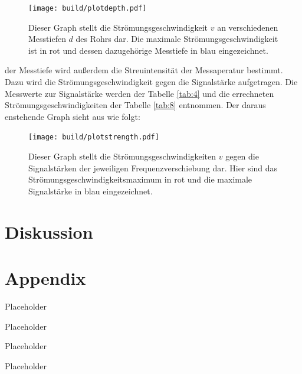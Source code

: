 \begin{figure}[H]
    \centering
    \texttt{[image: build/plotdepth.pdf]}
    \caption{Dieser Graph stellt die Strömungsgeschwindigkeit $v$ an verschiedenen Messtiefen $d$ des Rohrs dar. Die maximale Strömungsgeschwindigkeit ist in rot und dessen dazugehörige
    Messtiefe in blau eingezeichnet.}
    \label{fig:8}
\end{figure}

    \justifying der Messtiefe wird außerdem die Streuintensität der Messaperatur bestimmt. Dazu wird die Strömungsgeschwindigkeit gegen die Signalstärke aufgetragen.
    Die Messwerte zur Signalstärke werden der Tabelle \ref{tab:4} und die errechneten Strömungsgeschwindigkeiten der Tabelle \ref{tab:8} entnommen. Der daraus enstehende Graph
    sieht aus wie folgt:

\begin{figure}[H]
    \centering
    \texttt{[image: build/plotstrength.pdf]}
    \caption{Dieser Graph stellt die Strömungsgeschwindigkeiten $v$ gegen die Signalstärken der jeweiligen Frequenzverschiebung dar. Hier sind das Strömungsgeschwindigkeitsmaximum
    in rot und die maximale Signalstärke in blau eingezeichnet.}
    \label{fig:9}
\end{figure}

\section{Diskussion}

\newpage
\printbibliography

\newpage
\section*{Appendix}

\begin{table}[H]
    \centering
    \caption{Placeholder}
    
    \label{tab:1}
\end{table}

\begin{table}[H]
    \centering
    \caption{Placeholder}
    
    \label{tab:2}
\end{table}

\begin{table}[H]
    \centering
    \caption{Placeholder}
    
    \label{tab:3}
\end{table}

\begin{table}[H]
    \centering
    \caption{Placeholder}
    
    \label{tab:4}
\end{table}

